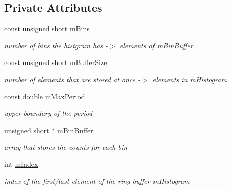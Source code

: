 \subsection*{Private Attributes}
\begin{DoxyCompactItemize}
\item 
\mbox{\label{classHistogramData_af2215c60a41f6ee19aaeb8be1cdd2392}} 
const unsigned short \hyperlink{classHistogramData_af2215c60a41f6ee19aaeb8be1cdd2392}{m\+Bins}
\begin{DoxyCompactList}\small\item\em number of bins the histgram has -\/$>$ elements of m\+Bin\+Buffer \end{DoxyCompactList}\item 
\mbox{\label{classHistogramData_adbf055d8f7bffe7e5e8a2c09936f8578}} 
const unsigned short \hyperlink{classHistogramData_adbf055d8f7bffe7e5e8a2c09936f8578}{m\+Buffer\+Size}
\begin{DoxyCompactList}\small\item\em number of elements that are stored at once -\/$>$ elements in m\+Histogram \end{DoxyCompactList}\item 
\mbox{\label{classHistogramData_a23bc716ad89d0ab89c93b4174c22f1a9}} 
const double \hyperlink{classHistogramData_a23bc716ad89d0ab89c93b4174c22f1a9}{m\+Max\+Period}
\begin{DoxyCompactList}\small\item\em upper boundary of the period \end{DoxyCompactList}\item 
\mbox{\label{classHistogramData_a3dc6361d2669ffd9b3df032b83a5809c}} 
unsigned short $\ast$ \hyperlink{classHistogramData_a3dc6361d2669ffd9b3df032b83a5809c}{m\+Bin\+Buffer}
\begin{DoxyCompactList}\small\item\em array that stores the counts for each bin \end{DoxyCompactList}\item 
\mbox{\label{classHistogramData_abb7fbb2fcbfb82dd8030122692dbcbd1}} 
int \hyperlink{classHistogramData_abb7fbb2fcbfb82dd8030122692dbcbd1}{m\+Index}
\begin{DoxyCompactList}\small\item\em index of the first/last element of the ring buffer m\+Histogram \end{DoxyCompactList}\item 

\end{DoxyCompactItemize}
